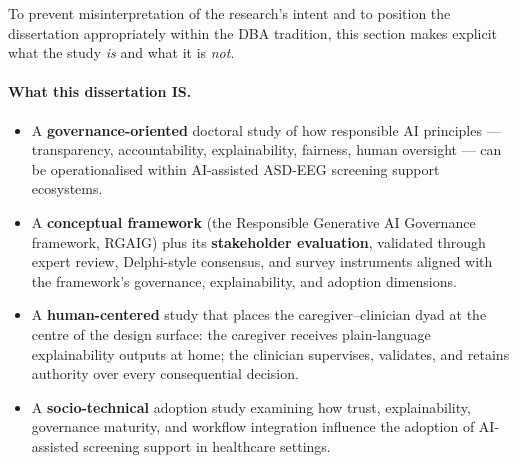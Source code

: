 To prevent misinterpretation of the research's intent and to position the dissertation appropriately within the DBA tradition, this section makes explicit what the study \emph{is} and what it is \emph{not}.

\paragraph{What this dissertation IS.}
\begin{itemize}[leftmargin=*, itemsep=3pt]
    \item A \textbf{governance-oriented} doctoral study of how responsible AI principles --- transparency, accountability, explainability, fairness, human oversight --- can be operationalised within AI-assisted ASD-EEG screening support ecosystems.
    \item A \textbf{conceptual framework} (the Responsible Generative AI Governance framework, RGAIG) plus its \textbf{stakeholder evaluation}, validated through expert review, Delphi-style consensus, and survey instruments aligned with the framework's governance, explainability, and adoption dimensions.
    \item A \textbf{human-centered} study that places the caregiver--clinician dyad at the centre of the design surface: the caregiver receives plain-language explainability outputs at home; the clinician supervises, validates, and retains authority over every consequential decision.
    \item A \textbf{socio-technical} adoption study examining how trust, explainability, governance maturity, and workflow integration influence the adoption of AI-assisted screening support in healthcare settings.
\end{itemize}

